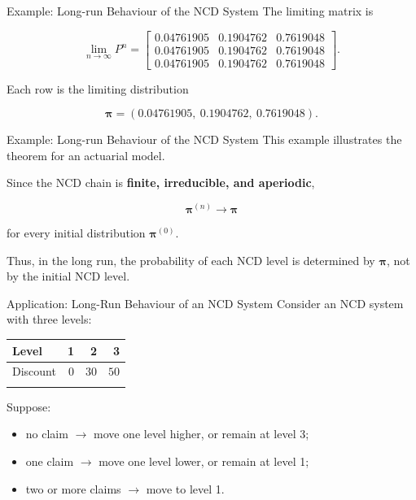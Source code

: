 \documentclass[
  ignorenonframetext,
  aspectratio=169,
]{beamer}
\newcounter{none} %
\providecommand{\tightlist}{%
  \setlength{\itemsep}{0pt}\setlength{\parskip}{0pt}}
\begin{document}
\begin{frame}{Example: Long-run Behaviour of the NCD System}
\protect{}\label{example-long-run-behaviour-of-the-ncd-system-4}
The limiting matrix is

\[
\lim_{n\to\infty}P^n
=
\begin{bmatrix}
0.04761905&0.1904762&0.7619048\\
0.04761905&0.1904762&0.7619048\\
0.04761905&0.1904762&0.7619048
\end{bmatrix}.
\]

Each row is the limiting distribution

\[
\boxed{
\boldsymbol{\pi}
=
(0.04761905,\ 0.1904762,\ 0.7619048)
}.
\]
\end{frame}

\begin{frame}{Example: Long-run Behaviour of the NCD System}
\protect{}\label{example-long-run-behaviour-of-the-ncd-system-5}
This example illustrates the theorem for an actuarial model.

Since the NCD chain is \textbf{finite, irreducible, and aperiodic},

\[
\boxed{
\boldsymbol{\pi}^{(n)}
\longrightarrow
\boldsymbol{\pi}
}
\]

for every initial distribution \(\boldsymbol{\pi}^{(0)}\).

Thus, in the long run, the probability of each NCD level is determined
by \(\boldsymbol{\pi}\), not by the initial NCD level.
\end{frame}

\begin{frame}{Application: Long-Run Behaviour of an NCD System}
\protect{}\label{application-long-run-behaviour-of-an-ncd-system}
Consider an NCD system with three levels:

{\def\LTcaptype{none} %
\begin{longtable}[]{@{}lrrr@{}}
\toprule\noalign{}
Level & 1 & 2 & 3 \\
\midrule\noalign{}
\endhead
Discount & \(0%
\) & \(30%
\) & \(50%
\) \\
\bottomrule\noalign{}
\end{longtable}
}

Suppose:

\begin{itemize}
\tightlist
\item
  no claim \(\rightarrow\) move one level higher, or remain at level 3;
\item
  one claim \(\rightarrow\) move one level lower, or remain at level 1;
\item
  two or more claims \(\rightarrow\) move to level 1.
\end{itemize}
\end{frame}
\end{document}
